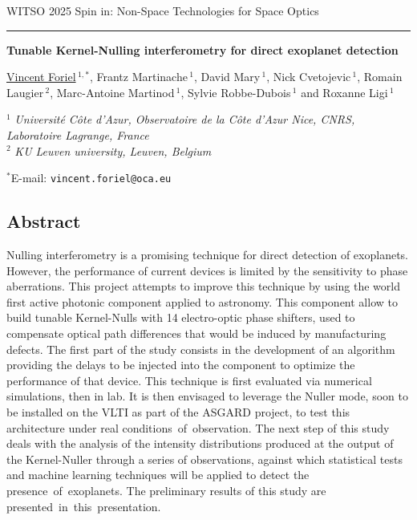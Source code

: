 \documentclass[12pt]{article}
\begin{document}
WITSO 2025
\hfill
Spin in: Non-Space Technologies for Space Optics

\smallskip
\hrule

\bigskip

\begin{center}
\LARGE \bf Tunable Kernel-Nulling interferometry for direct exoplanet detection\rm

\vspace{0.5cm}

\large  \underline{Vincent Foriel}$\,^{1,*}$, \large Frantz Martinache$\,^1$, \large David Mary$\,^1$, \large Nick Cvetojevic$\,^1$, \large Romain Laugier$\,^2$, Marc-Antoine Martinod$\,^1$, \large Sylvie Robbe-Dubois$\,^1$ and  \large Roxanne Ligi$\,^1$

\vspace{0.5cm}

\normalsize

$^1$ \textit{Université Côte d’Azur, Observatoire de la Côte d’Azur Nice, CNRS, Laboratoire Lagrange, France}\\
$^2$ \textit{KU Leuven university, Leuven, Belgium}

\vspace{0.3cm}
$^*$E-mail: {\tt vincent.foriel@oca.eu}

\end{center}
\vspace{-0.8cm}
\subsection*{\Large Abstract}

Nulling interferometry\cite{Bracewell 1979} is a promising technique for direct detection of exoplanets. However, the performance of current devices is limited by the sensitivity to phase aberrations. This project attempts to improve this technique by using the world first active photonic component applied to astronomy. This component allow to build tunable Kernel-Nulls\cite{Martinache et al. 2018} with 14 electro-optic phase shifters, used to compensate optical path differences that would be induced by manufacturing defects. The first part of the study consists in the development of an algorithm providing the delays to be injected into the component to optimize the performance of that device. This technique is first evaluated via numerical simulations, then in lab. It is then envisaged to leverage the Nuller mode, soon to be installed on the VLTI as part of the ASGARD project, to test this architecture under real conditions of observation. The next step of this study deals with the analysis of the intensity distributions produced at the output of the Kernel-Nuller\cite{Martinache et al. 2018, Cvetojevic et al. 2022} through a series of observations, against which statistical tests and machine learning techniques will be applied to detect the presence of exoplanets. The preliminary results of this study are presented in this presentation.
\end{document}
